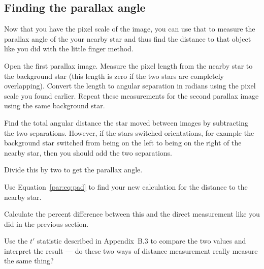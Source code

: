 \subsection{Finding the parallax angle}

Now that you have the pixel scale of the image, you can use that to measure the parallax angle of the your nearby star and thus find the distance to that object like you did with the little finger method.

\begin{steps}
	\item Open the first parallax image. Measure the pixel length from the nearby star to the background star (this length is zero if the two stars are completely overlapping). Convert the length to angular separation in radians using the pixel scale you found earlier. Repeat these measurements for the second parallax image using the same background star.

	\item Find the total angular distance the star moved between images by subtracting the two separations. However, if the stars switched orientations, for example the background star switched from being on the left to being on the right of the nearby star, then you should add the two separations.
	
	\item Divide this by two to get the parallax angle.
	
	\item Use Equation\ \ref{par:eq:pad} to find your new calculation for the distance to the nearby star.
	
	\item Calculate the percent difference between this and the direct measurement like you did in the previous section.
	
	\item Use the $t'$ statistic described in Appendix~B.3 to compare the two values and interpret the result --- do these two ways of distance measurement really measure the same thing? %
\end{steps}


